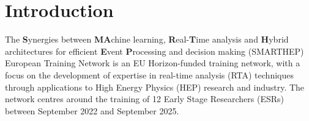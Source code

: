 \section{Introduction}
\label{intro}
The \textbf{S}ynergies between \textbf{MA}chine learning, \textbf{R}eal-\textbf{T}ime analysis and \textbf{H}ybrid architectures for efficient \textbf{E}vent \textbf{P}rocessing and decision making (SMARTHEP) European Training Network is an EU Horizon-funded training network, with a focus on the development of expertise in real-time analysis (RTA) techniques through applications to High Energy Physics (HEP) research and industry. The network centres around the training of 12 Early Stage Researchers (ESRs) between September 2022 and September 2025.